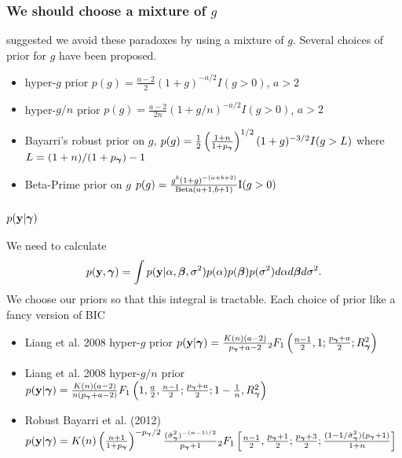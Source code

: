 \documentclass{beamer}
\begin{document}
\begin{frame}
	\frametitle{We should choose a mixture of $g$}
	\citep{Liang2008} suggested we avoid these paradoxes by using a mixture of $g$. Several choices of prior
	for $g$	have been proposed.
	\small
	\begin{itemize}
		\item hyper-$g$ prior $p(g) = \frac{a-2}{2} (1 + g)^{-a/2} I(g > 0)$, $a > 2$ \citep{Liang2008}
		\item hyper-$g/n$ prior $p(g) = \frac{a-2}{2n} (1 + g/n)^{-a/2} I(g > 0)$, $a > 2$ \citep{Liang2008}
		\item Bayarri's robust prior on $g$,
					$p(g) = \frac{1}{2} \left(  \frac{1 + n}{1 + p_{\boldsymbol \gamma}} \right)^{1/2} (1 + g)^{-3/2} I(g > L)$
					where $L = (1 + n)/(1 + p_{\boldsymbol \gamma}) - 1$
		\item Beta-Prime prior on $g$ 
		$p(g) = \frac{g^b (1 + g)^{-(a + b + 2)}}{\text{Beta}(a + 1, b + 1)} \text{I}(g > 0)$
		\citep{Maruyama2011}
	\end{itemize}
\end{frame}

\begin{frame}
	\frametitle{$p({\bf y} | {\boldsymbol \gamma})$}
	We need to calculate
	$$p({\bf y}, {\boldsymbol \gamma}) = \int p({\bf y} | \alpha, {\boldsymbol \beta}, \sigma^2) p(\alpha) p({\boldsymbol \beta}) p(\sigma^2) d \alpha d {\boldsymbol \beta} d \sigma^2.$$
	We choose our priors so that this integral is tractable. Each choice of prior like a fancy version of BIC
	\small
	\begin{itemize}
		\item Liang et al. 2008 hyper-$g$ prior \citep{Liang2008}
			$p({\bf y} | {\boldsymbol \gamma}) = \frac{K(n) (a - 2)}{p_{\boldsymbol \gamma} + a  - 2} {}_2 F_1 \left( \frac{n-1}{2}, 1; \frac{p_{\boldsymbol \gamma} + a}{2}; R_{\boldsymbol \gamma}^2 \right)$
		\item Liang et al. 2008 hyper-$g/n$ prior \citep{Liang2008}
			$p({\bf y} | {\boldsymbol \gamma}) = \frac{K(n) (a - 2)}{n (p_{\boldsymbol \gamma} + a  - 2)} F_1 \left( 1, \frac{a}{2}, \frac{n-1}{2}; \frac{p_{\boldsymbol \gamma} + a}{2}; 1 - \frac{1}{n}, R_{\boldsymbol \gamma}^2 \right)$
		\item Robust Bayarri et al. (2012) \citep{Bayarri2012} 
			\tiny
			$p({\bf y} | {\boldsymbol \gamma}) = K(n) \left(\frac{n + 1}{1 + p_{\boldsymbol \gamma}}\right)^{-p_{\boldsymbol \gamma}/2} \frac{(\hat{\sigma}_{\boldsymbol \gamma}^2)^{-(n-1)/2}}{p_{\boldsymbol \gamma} + 1} {}_2 F_1 \left[ \frac{n-1}{2}, \frac{p_{\boldsymbol \gamma}+1}{2}; \frac{p_{\boldsymbol \gamma} + 3}{2}; \frac{(1 - 1/\hat{\sigma}_{\boldsymbol \gamma}^2)(p_{\boldsymbol \gamma} + 1)}{1 + n} \right]$
	\end{itemize}
\end{frame}
\end{document}
